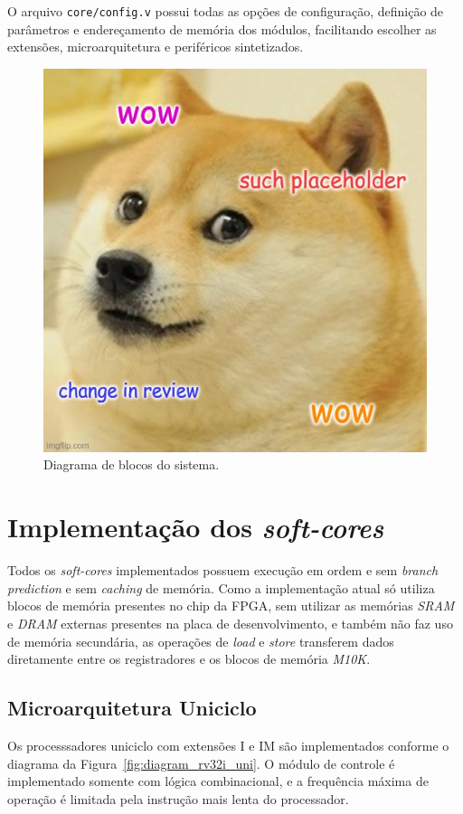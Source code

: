 {
    O arquivo \texttt{core/config.v} possui todas as opções de configuração,
    definição de parâmetros e endereçamento de memória dos módulos, facilitando
    escolher as extensões, microarquitetura e periféricos sintetizados.
}


\begin{figure}[H]
\centering
    \includegraphics[width=0.6\linewidth]{../images/placeholder.jpg}
    \caption{Diagrama de blocos do sistema.}\label{fig:diagram_fpga_blocks}
\end{figure}


\section{Implementação dos \textit{soft-cores}}
    { Todos os \textit{soft-cores} implementados possuem execução em ordem e sem
        \textit{branch prediction} e sem \textit{caching} de memória. Como a
        implementação atual só utiliza blocos de memória presentes no chip da
        FPGA, sem utilizar as memórias \textit{SRAM} e \textit{DRAM} externas
        presentes na placa de desenvolvimento, e também não faz uso de memória
        secundária, as operações de \textit{load} e \textit{store} transferem
        dados diretamente entre os registradores e os blocos de memória
        \textit{M10K}.
    }

    \subsection{Microarquitetura Uniciclo}

        { Os processsadores uniciclo com extensões I e IM são implementados
            conforme o diagrama da Figura~\ref{fig:diagram_rv32i_uni}. O módulo
            de controle é implementado somente com lógica combinacional, e a
            frequência máxima de operação é limitada pela instrução mais lenta
            do processador.
        }

